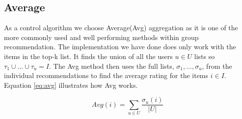 \subsection{Average}\label{sec:average}
As a control algorithm we choose Average(Avg) aggregation as it is one of the more commonly used and well performing methods within group recommendation\cite{recbook:average}. The implementation we have done does only work with the items in the top-k list. It finds the union of all the users $u\in U$ lists so $\tau_1 \cup ... \cup \tau_u = I$. The Avg method then uses the full lists, $\sigma_1, ..., \sigma_u$, from the individual recommendations to find the average rating for the items $i \in I$. Equation \ref{eq:avg} illustrates how Avg works.

\begin{equation}\label{eq:avg}
Avg(i) = \sum_{u \in U}\frac{\sigma_u(i)}{|U|} 
\end{equation}